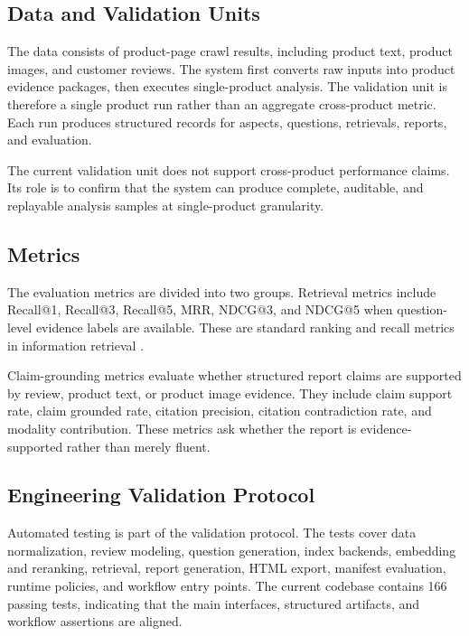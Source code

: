 \documentclass[11pt]{article}
\begin{document}
\subsection{Data and Validation Units}

The data consists of product-page crawl results, including product text, product images, and customer reviews. The system first converts raw inputs into product evidence packages, then executes single-product analysis. The validation unit is therefore a single product run rather than an aggregate cross-product metric. Each run produces structured records for aspects, questions, retrievals, reports, and evaluation.

The current validation unit does not support cross-product performance claims. Its role is to confirm that the system can produce complete, auditable, and replayable analysis samples at single-product granularity.

\subsection{Metrics}

The evaluation metrics are divided into two groups. Retrieval metrics include Recall@1, Recall@3, Recall@5, MRR, NDCG@3, and NDCG@5 when question-level evidence labels are available. These are standard ranking and recall metrics in information retrieval \citep{manning2008introductionIr}.

Claim-grounding metrics evaluate whether structured report claims are supported by review, product text, or product image evidence. They include claim support rate, claim grounded rate, citation precision, citation contradiction rate, and modality contribution. These metrics ask whether the report is evidence-supported rather than merely fluent.

\subsection{Engineering Validation Protocol}

Automated testing is part of the validation protocol. The tests cover data normalization, review modeling, question generation, index backends, embedding and reranking, retrieval, report generation, HTML export, manifest evaluation, runtime policies, and workflow entry points. The current codebase contains 166 passing tests, indicating that the main interfaces, structured artifacts, and workflow assertions are aligned.
\end{document}

